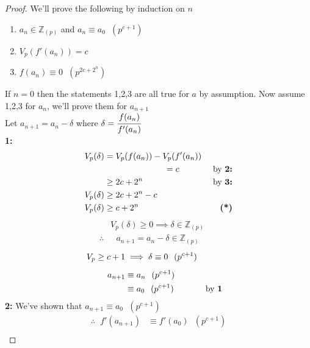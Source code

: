 \documentclass[11pt]{article}
\begin{document}
\begin{proof}
We'll prove the following by induction on $n$
	\begin{enumerate}
		\item{$a_n \in \mathbb{Z}_{(p)}$ and $a_n \equiv a_0 \hspace{7pt} (p^{c+1})$}
		\item{$V_p(f'(a_n)) = c$}
		\item{$f(a_n) \equiv 0 \hspace{7pt}(p^{2c+2^n})$}
	\end{enumerate}
	If $n=0$ then the statements 1,2,3 are all true for $a$ by assumption.
	Now assume 1,2,3 for $a_n$, we'll prove them for $a_{n+1}$\\[1em]
	Let $a_{n+1} = a_n - \delta$  where $\delta = \cfrac{f(a_n)}{f'(a_n)}$\\[0.5em]	
	\textbf{1: }
	\begin{align*}	
		V_p(\delta) &= V_p(f(a_n)) -V_p(f'(a_n)) \\
		&\hspace{70pt} =c &\text{ by \bf{2:}}\\
		&\geq 2c+2^n &\text{ by \bf{3:}}\\
		V_p(\delta) &\geq 2c +2^n - c\\
		V_p(\delta) &\geq c +2^n &\textbf{(*)}\\
	\end{align*}
	\begin{align*}
		&V_p(\delta) \geq 0 \implies \delta \in \mathbb{Z}_{(p)} &&\\[0.5em]
		\therefore & \text{ }a_{n+1} = a_n - \delta \in \mathbb{Z}_{(p)}
	\end{align*}
	\begin{align*}
		V_{p} \geq c+1 &\implies \delta \equiv 0 \hspace{7pt} (p^{c+1})\\[0.5em]
		a_{n+1} &\equiv a_n \hspace{7pt} (p^{c+1})\\
		&\equiv a_0 \hspace{7pt} (p^{c+1}) && \text{by \bf{1}}
	\end{align*}
	\textbf{2: }We've shown that $a_{n+1} \equiv a_0 \hspace{7pt} (p^{c+1})$
	\begin{align*}
		\therefore \hspace{7pt} f'(a_{n+1}) &\equiv f'(a_0) \hspace{7pt} (p^{c+1})\\

\end{align*}
\end{proof}
\end{document}
